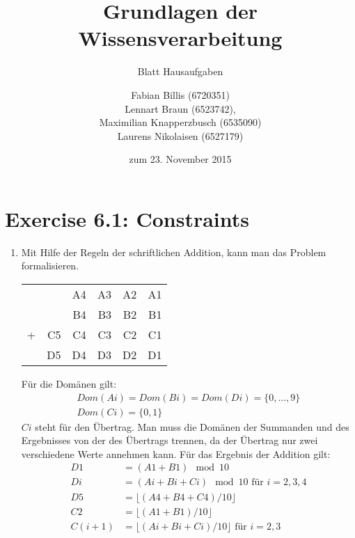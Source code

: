 \documentclass[a4paper]{scrartcl}
\title{Grundlagen der Wissensverarbeitung}
\subtitle{Blatt {\blattnr} Hausaufgaben}
\author{
    Fabian Billis (6720351) \\
    Lennart Braun (6523742), \\
    Maximilian Knapperzbusch (6535090) \\
    Laurens Nikolaisen (6527179) \\
}
\date{zum 23. November 2015}
\def \blattnr {6}
\begin{document}
\maketitle

\section*{Exercise \blattnr.1: Constraints}
\begin{enumerate}
    \item
        Mit Hilfe der Regeln der schriftlichen Addition, kann man das Problem
        formalisieren.
        \begin{center}
            \begin{tabular}{crrrrr}
                  &    & A4 & A3 & A2 & A1 \\
                  &    & B4 & B3 & B2 & B1 \\
                + & C5 & C4 & C3 & C2 & C1 \\ \hline
                  & D5 & D4 & D3 & D2 & D1
            \end{tabular}
        \end{center}
        Für die Domänen gilt:
        \begin{gather*}
            Dom(Ai) = Dom(Bi) = Dom(Di) = \{0,...,9\} \\
            Dom(Ci) = \{0,1\}
        \end{gather*}
        $Ci$ steht für den Übertrag.  Man muss die Domänen der Summanden und
        des Ergebnisses von der des Übertrags trennen, da der Übertrag nur zwei
        verschiedene Werte annehmen kann. Für das Ergebnis der Addition gilt:
        \begin{align*}
            D1 &= (A1 + B1) \mod 10 \\
            Di &= (Ai + Bi + Ci) \mod 10 \text{ für } i = 2,3,4 \\
            D5 &= \lfloor (A4 + B4 + C4) / 10 \rfloor \\
            C2 &= \lfloor (A1 + B1) / 10 \rfloor \\
            C(i+1) &= \lfloor (Ai + Bi + Ci) / 10 \rfloor
            \text{ für }  i = 2,3
        \end{align*}

        \begin{landscape}
            \vspace*{\fill}
            \begin{figure}[h]
                \centering
\end{figure}
\end{landscape}
\end{enumerate}
\end{document}
